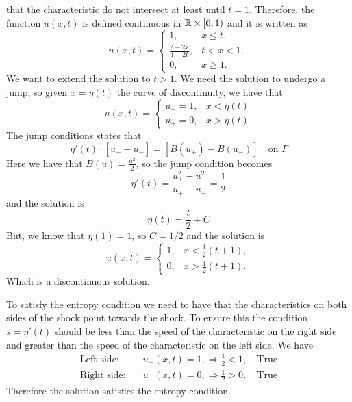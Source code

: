 that the characteristic do not intersect at least until \(t=1\).
Therefore, the function \(u(x,t)\) is defined continuous in \(\mathbb{R} \times [0, 1)\) and it is written as
\[
    u(x,t) = \begin{cases}
        1,                 & x \leq t,  \\
        \frac{2-2x}{1-2t}, & t < x < 1, \\
        0,                 & x \geq 1.
    \end{cases}
\]
We want to extend the solution to \(t > 1\). We need the solution to undergo a
jump, so given \(x = \eta(t)\) the curve of discontinuity, we have that
\[
    u(x, t) = \begin{cases}
        u_- = 1, & x < \eta(t) \\
        u_+ = 0, & x > \eta(t)
    \end{cases}
\]
The jump conditions states that
\[
    \eta'(t) \cdot \left[u_+ - u_-\right] = \left[B(u_+) - B(u_-)\right] \quad \text{on } \Gamma
\]
Here we have that \(B(u) = \frac{u^2}{2}\), so the jump condition becomes
\[
    \eta'(t) = \frac{u_+^2 - u_-^2}{u_+ - u_-} = \frac{1}{2}
\]
and the solution is
\[
    \eta(t) = \frac{t}{2} + C
\]
But, we know that \(\eta(1) = 1\), so \(C = 1/2\) and the solution is
\[
    u(x,t) = \begin{cases}
        1, & x < \frac{1}{2}(t+1), \\
        0, & x > \frac{1}{2}(t+1).
    \end{cases}
\]
Which is a discontinuous solution.

To satisfy the entropy condition we need to have that the characteristics on
both sides of the shock point towards the shock. To ensure this the condition
\(s = \eta'(t)\) should be less than the speed of the characteristic on the
right side and greater than the speed of the characteristic on the left side.
We have
\begin{align*}
    \text{Left side:}  & \quad u_-(x,t) = 1, \Rightarrow \frac{1}{2} < 1, \quad \text{True} \\
    \text{Right side:} & \quad u_+(x,t) = 0, \Rightarrow \frac{1}{2} > 0, \quad \text{True}
\end{align*}
Therefore the solution satisfies the entropy condition.

